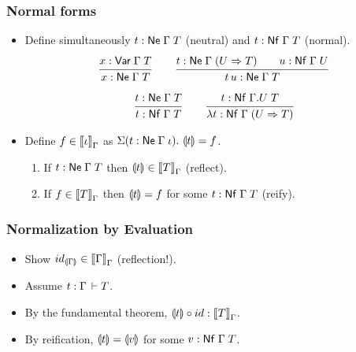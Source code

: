 \documentclass[t,fleqn,usenames,dvipsnames]{beamer}
\makeatletter
\renewcommand{\Var}[2]{\tVar\;#1\;#2}
\renewcommand{\ru}[2]{\dfrac{\begin{array}[b]{@{}c@{}} #1 \end{array}}{\begin{array}[t]{@{}l@{}} #2 \end{array}}}
\makeatother
\begin{document}
\begin{frame}%
  \frametitle{Normal forms}
  \vspace{-3ex}
  \begin{itemize}
  \item Define simultaneously $t : \mathsf{Ne}\;\Gamma\;T$ (neutral)
  and $t : \mathsf{Nf}\;\Gamma\;T$ (normal).
\[
  \ru{x : \Var \Gamma T
    }{x : \Ne \Gamma T}
\qquad
  \ru{t : \Ne \Gamma (U \To T) \qquad u : \Nf \Gamma U
    }{t\,u : \Ne \Gamma T}
\]
\[
  \ru{t : \Ne \Gamma T
    }{t : \Nf \Gamma T}
\qquad
  \ru{t : \Nf {\Gamma.U} T
    }{\lambda t : \Nf \Gamma (U \To T)}
\]
  \item Define $f \in \mathopen{{[\kern-0.14em[}} \iota \mathclose{{]\kern-0.14em]}}_{\Gamma}$ as $\Sigma (t : \mathsf{Ne}\;\Gamma\;\iota).\ \llparenthesis t\rrparenthesis = f$.
    \begin{theorem}
      \begin{enumerate}
      \item If $t : \mathsf{Ne}\;\Gamma\;T$ then $\llparenthesis t\rrparenthesis \in \mathopen{{[\kern-0.14em[}} T \mathclose{{]\kern-0.14em]}}_{\Gamma}$ (reflect).
      \item If $f \in \mathopen{{[\kern-0.14em[}} T \mathclose{{]\kern-0.14em]}}_{\Gamma}$ then $\llparenthesis t\rrparenthesis = f$ for some $t :
        \mathsf{Nf}\;\Gamma\;T$ (reify).
      \end{enumerate}
    \end{theorem}
  \end{itemize}
\end{frame}


\begin{frame}%
  \frametitle{Normalization by Evaluation}
  \vspace{-3ex}
  \begin{itemize}
  \item Show $id_{\llparenthesis\Gamma\rrparenthesis} \in \mathopen{{[\kern-0.14em[}} \Gamma \mathclose{{]\kern-0.14em]}}_{\Gamma}$ (reflection!).
  \item Assume $t : \Gamma \,\vdash T$.
  \item By the fundamental theorem, $\llparenthesis t\rrparenthesis \circ id : \mathopen{{[\kern-0.14em[}} T \mathclose{{]\kern-0.14em]}}_{\Gamma}$.
  \item By reification, $\llparenthesis t\rrparenthesis = \llparenthesis v\rrparenthesis$ for some $v : \mathsf{Nf}\;\Gamma\;T$.
  \end{itemize}
\end{frame}
\end{document}
